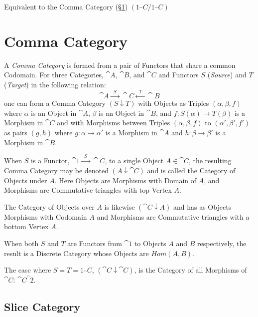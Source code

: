 Equivalent to the Comma Category (\S\ref{sec:comma_category})
$(1_\cat{C}/1_\cat{C})$



\section{Comma Category}\label{sec:comma_category}

A \emph{Comma Category} is formed from a pair of Functors that share a
common Codomain. For three Categories, $\cat{A}$, $\cat{B}$, and
$\cat{C}$ and Functors $S$ (\emph{Source}) and $T$ (\emph{Target}) in
the following relation:
\[
  \cat{A} \xrightarrow{\;\; S\;\;} \cat{C} \xleftarrow{\;\;
    T\;\;} \cat{B}
\]
one can form a Comma Category $(S \downarrow T)$ with Objects as
Triples $(\alpha, \beta, f)$ where $\alpha$ is an Object in
$\cat{A}$, $\beta$ is an Object in $\cat{B}$, and $f : S(\alpha)
\rightarrow T(\beta)$ is a Morphism in $\cat{C}$ and with Morphisms
between Triples $(\alpha, \beta, f)$ to $(\alpha', \beta', f')$ as
pairs $(g,h)$ where $g : \alpha \rightarrow \alpha'$ is a Morphism in
$\cat{A}$ and $h : \beta \rightarrow \beta'$ is a Morphism in
$\cat{B}$.

When $S$ is a Functor, $\cat{1} \xrightarrow{\;\;S\;\;}
\cat{C}$, to a single Object $A \in \cat{C}$, the resulting
Comma Category may be denoted $(A \downarrow \cat{C})$ and is
called the Category of Objects under $A$. Here Objects are Morphisms
with Domain of $A$, and Morphisms are Commutative triangles with top
Vertex $A$.

The Category of Objects over $A$ is likewise $(\cat{C} \downarrow
A)$ and has as Objects Morphisms with Codomain $A$ and Morphisms are
Commutative triangles with a bottom Vertex $A$.

When both $S$ and $T$ are Functors from $\cat{1}$ to Objects $A$
and $B$ respectively, the result is a Discrete Category whose Objects
are $Hom(A,B)$.

The case where $S = T = 1_\cat{C}$, $(\cat{C} \downarrow
\cat{C})$, is the Category of all Morphisms of $\cat{C}$:
$\cat{C}^\cat{2}$.



\subsection{Slice Category}\label{sec:slice_category}

